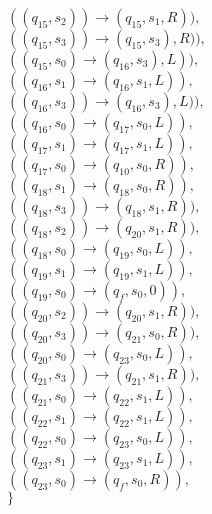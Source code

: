 \documentclass{article} %
\begin{document}
\begin{center}
\begin{varwidth}{\textwidth}
\begin{tasks}[label={},label-width={1cm}]
                \task
                $((q_{15}, s_{2})) \to (q_{15}, s_{1}, R)),$\\
                $((q_{15}, s_{3})) \to (q_{15}, s_{3}), R)),$\\
                $((q_{15}, s_{0}) \to (q_{16}, s_{3}), L)),$\\
                $((q_{16}, s_{1}) \to (q_{16}, s_{1}, L)),$\\
                $((q_{16}, s_{3})) \to (q_{16}, s_{3}), L)),$\\
                $((q_{16}, s_{0}) \to (q_{17}, s_{0}, L)),$\\
                $((q_{17}, s_{1}) \to (q_{17}, s_{1}, L)),$\\
                $((q_{17}, s_{0}) \to (q_{10}, s_{0}, R)),$\\
                $((q_{18}, s_{1}) \to (q_{18}, s_{0}, R)),$\\
                $((q_{18}, s_{3})) \to (q_{18}, s_{1}, R)),$\\
                $((q_{18}, s_{2})) \to (q_{20}, s_{1}, R)),$\\
                $((q_{18}, s_{0}) \to (q_{19}, s_{0}, L)),$\\
                $((q_{19}, s_{1}) \to (q_{19}, s_{1}, L)),$\\
                $((q_{19}, s_{0}) \to (q_{f}, s_{0}, 0)),$\\
                $((q_{20}, s_{2})) \to (q_{20}, s_{1}, R)),$\\
                $((q_{20}, s_{3})) \to (q_{21}, s_{0}, R)),$\\
                $((q_{20}, s_{0}) \to (q_{23}, s_{0}, L)),$\\
                $((q_{21}, s_{3})) \to (q_{21}, s_{1}, R)),$\\
                $((q_{21}, s_{0}) \to (q_{22}, s_{1}, L)),$\\
                $((q_{22}, s_{1}) \to (q_{22}, s_{1}, L)),$\\
                $((q_{22}, s_{0}) \to (q_{23}, s_{0}, L)),$\\
                $((q_{23}, s_{1}) \to (q_{23}, s_{1}, L)),$\\
                $((q_{23}, s_{0}) \to (q_{f}, s_{0}, R)),$\\
                $\}$
            \end{tasks}
            \end{varwidth}
        \end{center}
\end{document}

